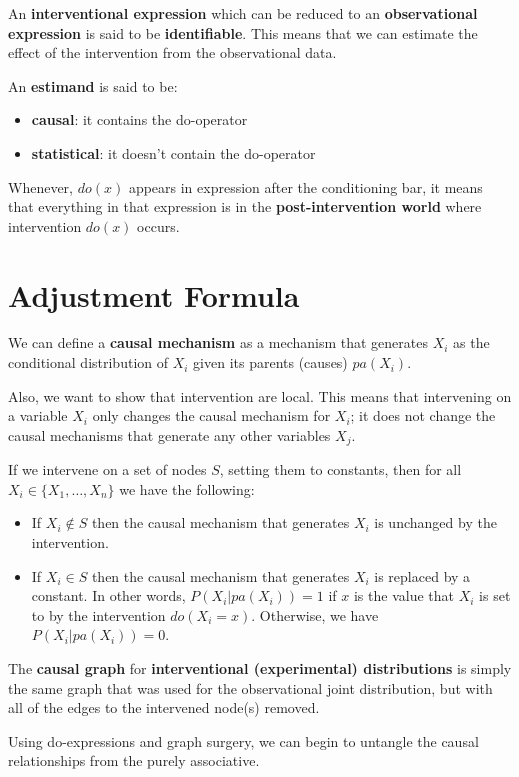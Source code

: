 An \textbf{interventional expression} which can be reduced to an \textbf{observational expression}
is said to be \textbf{identifiable}. This means that we can estimate the effect
of the intervention from the observational data.

An \textbf{estimand} is said to be:
\begin{itemize}
      \item \textbf{causal}: it contains the do-operator
      \item \textbf{statistical}: it doesn't contain the do-operator
\end{itemize}

Whenever, $do(x)$ appears in expression after the conditioning bar, it means
that everything in that expression is in the \textbf{post-intervention world}
where intervention $do(x)$ occurs.


\section{Adjustment Formula}
We can define a \textbf{causal mechanism} as a mechanism that generates $X_i$ as
the conditional distribution of $X_i$ given its parents (causes) $pa(X_i)$.

Also, we want to show that intervention are local. This means that intervening on
a variable $X_i$ only changes the causal mechanism for $X_i$; it does not change
the causal mechanisms that generate any other variables $X_j$.
\begin{definition}
      If we intervene on a set of nodes $S$, setting them to constants, then for
      all $X_i \in \{X_1, \ldots, X_n\}$ we have the following:
      \begin{itemize}
            \item If $X_i \notin S$ then the causal mechanism that generates $X_i$
                  is unchanged by the intervention.
            \item If $X_i \in S$ then the causal mechanism that generates $X_i$ is
                  replaced by a constant. In other words, $P(X_i | pa(X_i)) = 1$
                  if $x$ is the value that $X_i$ is set to by the intervention
                  $do(X_i = x)$. Otherwise, we have $P(X_i | pa(X_i)) = 0$.
      \end{itemize}
\end{definition}
\begin{note}
      The \textbf{causal graph} for \textbf{interventional (experimental) distributions} is simply
      the same graph that was used for the observational joint distribution, but
      with all of the edges to the intervened node(s) removed.
\end{note}
Using do-expressions and graph surgery, we can begin to untangle the causal
relationships from the purely associative.


